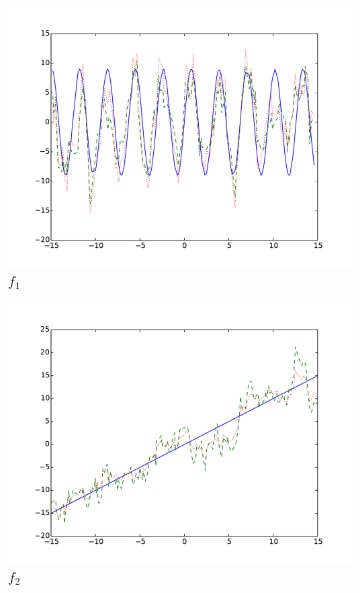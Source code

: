 \documentclass[12pt,letterpaper]{article}
\begin{document}
\begin{figure}
\begin{subfigure}[b]{0.5\textwidth}
\includegraphics[width=1.1\textwidth] {train_gs_v_hc_f3_0.pdf}
\caption{$f_1$}
\end{subfigure}
\begin{subfigure}[b]{0.5\textwidth}
\includegraphics[width=1.1\textwidth]  {train_gs_v_hc_f3_1.pdf}
\caption{$f_2$}
\end{subfigure}
\begin{subfigure}[b]{0.5\textwidth}

\end{subfigure}
\end{figure}
\end{document}
